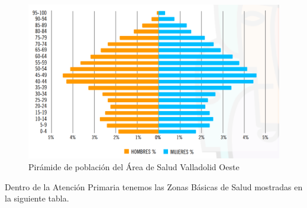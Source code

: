 \begin{figure}[H]
    \centering
    \includegraphics[width=\textwidth]{img/piramide-poblacion.png}
    \caption{Pirámide de población del Área de Salud Valladolid Oeste}
\end{figure}

Dentro de la Atención Primaria tenemos las Zonas Básicas de Salud mostradas en la siguiente tabla.

